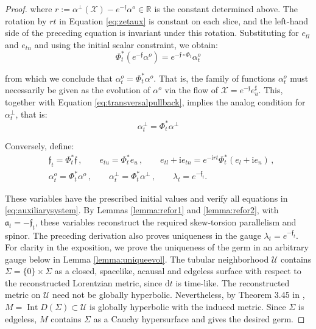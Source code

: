 \documentclass[10pt,reqno,a4paper]{amsart}
\theoremstyle{plain}
\theoremstyle{definition}
\theoremstyle{remark}
\theoremstyle{remark}
\def\dd{\mathrm{d}}
\def\cX{\mathcal{X}}
\def\fra{\mathfrak{a}}
\def\cU{\mathcal{U}}
\renewcommand{\(}{ (}
\renewcommand{\)}{ )}
\newcommand{\frf}{\mathfrak{f}}
\begin{document}
\begin{proof}
\noindent
where $ r := \alpha^{\perp} (\cX) - e^{-\frf} \alpha^o \in \mathbb{R}$ is the constant determined above. The rotation by $rt$ in Equation \eqref{eq:zetaux} is constant on each slice, and the left-hand side of the preceding equation is invariant under this rotation. Substituting for $e_{tl}$ and $e_{tn}$ and using the initial scalar constraint, we obtain:
\begin{equation*}
\Phi_t^{\ast} ( e^{-\frf} \alpha^o) =  e^{-\frf \circ \Phi_t} \alpha^o_t         
\end{equation*}

\noindent
from which we conclude that $\alpha_t^o = \Phi_t^{\ast}\alpha^o$. That is, the family of functions $\alpha^o_t$ must necessarily be given as the evolution of $\alpha^o$ via the flow of $\cX = e^{-\frf} e^{\sharp}_u$. This, together with Equation \eqref{eq:transversalpullback}, implies the analog condition for $\alpha^{\perp}_t$, that is:
\begin{equation*}
\alpha^{\perp}_t = \Phi^{\ast}_t \alpha^{\perp}
\end{equation*}

\noindent
Conversely, define:
\begin{eqnarray*}
& \frf_t=\Phi_t^{\ast}\frf\, , \qquad e_{tu}=\Phi_t^{\ast}e_u\, , \qquad
e_{tl}+\mathrm{i}e_{tn}=e^{-\mathrm{i}rt}\Phi_t^{\ast}(e_l+\mathrm{i}e_n)\, , \\
& \alpha_t^o=\Phi_t^{\ast}\alpha^o\, , \qquad \alpha_t^{\perp}=\Phi_t^{\ast}\alpha^{\perp}\, , \qquad \lambda_t=e^{-\frf_t}.
\end{eqnarray*}

\noindent
These variables have the prescribed initial values and verify all equations in \eqref{eq:auxiliarysystem}. By Lemmas \ref{lemma:refor1} and \ref{lemma:refor2}, with $\fra_t=-\frf_t$, these variables reconstruct the required skew-torsion parallelism and spinor. The preceding derivation also proves uniqueness in the gauge $\lambda_t=e^{-\frf_t}$. For clarity in the exposition, we prove the uniqueness of the germ in an arbitrary gauge below in Lemma \ref{lemma:uniqueevol}. The tubular neighborhood $\cU$ contains $\Sigma=\{0\}\times\Sigma$ as a closed, spacelike, acausal and edgeless surface with respect to the reconstructed Lorentzian metric, since $\dd t$ is time-like. The reconstructed metric on $\cU$ need not be globally hyperbolic. Nevertheless, by Theorem 3.45 in \cite{Minguzzi:2019mbe}, $M=\operatorname{Int}D(\Sigma)\subset\cU$ is globally hyperbolic with the induced metric. Since $\Sigma$ is edgeless, $M$ contains $\Sigma$ as a Cauchy hypersurface and gives the desired germ. \medskip


\end{proof}
\end{document}
